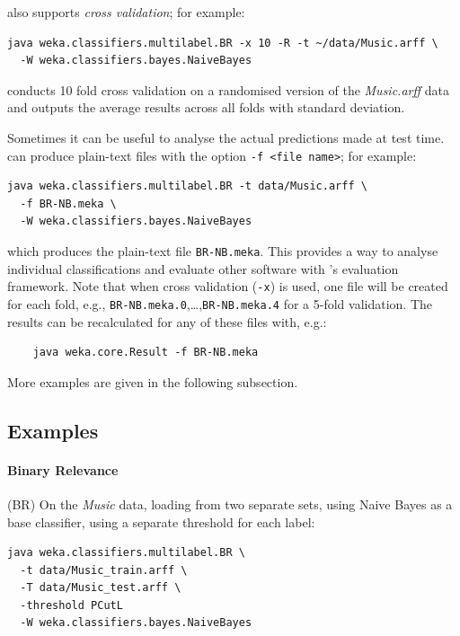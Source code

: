 \documentclass[11pt]{article}
\newcommand{\MEKA}{Meka}
\begin{document}
\framework{\MEKA} also supports \emph{cross validation}; for example:
\begin{verbatim}
java weka.classifiers.multilabel.BR -x 10 -R -t ~/data/Music.arff \
  -W weka.classifiers.bayes.NaiveBayes
\end{verbatim}
conducts 10 fold cross validation on a randomised version of the \textit{Music.arff} data and outputs the average results across all folds with standard deviation. %

Sometimes it can be useful to analyse the actual predictions made at test time. \framework{\MEKA} can produce plain-text files with the option \texttt{-f <file name>}; for example:
\begin{verbatim}
java weka.classifiers.multilabel.BR -t data/Music.arff \ 
  -f BR-NB.meka \
  -W weka.classifiers.bayes.NaiveBayes
\end{verbatim}
which produces the plain-text file \texttt{BR-NB.meka}. This provides a way to analyse individual classifications and evaluate other software with \framework{\MEKA}'s evaluation framework. Note that when cross validation (\texttt{-x}) is used, one file will be created for each fold, e.g., \texttt{BR-NB.meka.0},\ldots,\texttt{BR-NB.meka.4} for a 5-fold validation. The results can be recalculated for any of these files with, e.g.:
\begin{verbatim}
	java weka.core.Result -f BR-NB.meka
\end{verbatim}

More examples are given in the following subsection.

\subsection{Examples} 



\paragraph{Binary Relevance} (BR) On the \textit{Music} data, loading from two separate sets, using Naive Bayes as a base classifier, using a separate threshold for each label: 
\begin{verbatim}
java weka.classifiers.multilabel.BR \
  -t data/Music_train.arff \
  -T data/Music_test.arff \
  -threshold PCutL
  -W weka.classifiers.bayes.NaiveBayes
\end{verbatim}
\end{document}
